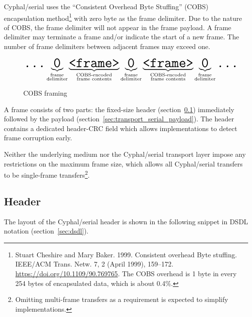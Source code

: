 Cyphal/serial uses the ``Consistent Overhead Byte Stuffing'' (COBS) encapsulation method\footnote{%
    Stuart Cheshire and Mary Baker. 1999. Consistent overhead Byte stuffing.
    IEEE/ACM Trans. Netw. 7, 2 (April 1999), 159--172. \mbox{\url{https://doi.org/10.1109/90.769765}}.
    The COBS overhead is 1 byte in every 254 bytes of encapsulated data, which is about 0.4\%.
} with zero byte as the frame delimiter.
Due to the nature of COBS, the frame delimiter will not appear in the frame payload.
A frame delimiter may terminate a frame and/or indicate the start of a new frame.
The number of frame delimiters between adjacent frames may exceed one.

\begin{figure}[H]
    \centering
    $$
    \texttt{\huge{...}}%
    \underbrace{\texttt{\huge{0}}}_{\substack{\text{frame} \\ \text{delimiter}}}%
    \underbrace{\texttt{\huge{<frame>}}}_{\substack{\text{COBS-encoded} \\ \text{frame contents}}}%
    \underbrace{\texttt{\huge{0}}}_{\substack{\text{frame} \\ \text{delimiter}}}%
    \underbrace{\texttt{\huge{<frame>}}}_{\substack{\text{COBS-encoded} \\ \text{frame contents}}}%
    \underbrace{\texttt{\huge{0}}}_{\substack{\text{frame} \\ \text{delimiter}}}%
    \texttt{\huge{...}}%
    $$
    \caption{COBS framing\label{fig:transport_serial_cobs}}
\end{figure}

A frame consists of two parts:
the fixed-size header (section~\ref{sec:transport_serial_header})
immediately followed by the payload (section~\ref{sec:transport_serial_payload}).
The header contains a dedicated header-CRC field which allows implementations to detect frame corruption early.

Neither the underlying medium nor the Cyphal/serial transport layer impose any restrictions on the maximum frame size,
which allows all Cyphal/serial transfers to be single-frame transfers\footnote{%
    Omitting multi-frame transfers as a requirement is expected to simplify implementations.
}.

\subsection{Header}\label{sec:transport_serial_header}

The layout of the Cyphal/serial header is shown in the following snippet in DSDL notation
(section~\ref{sec:dsdl}).

